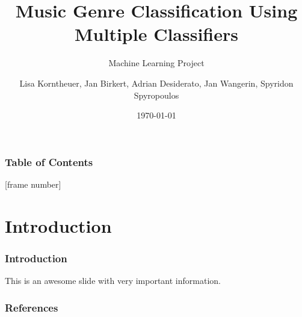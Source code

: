 \documentclass[10pt, aspectratio=169]{beamer}
\title{Music Genre Classification Using Multiple Classifiers}
\subtitle{Machine Learning Project}
\author{Lisa Korntheuer, Jan Birkert, Adrian Desiderato, Jan Wangerin, Spyridon Spyropoulos}
\institute{Technische Hochschule Ulm}
\date{\today}
\begin{document}
\newcommand{\subtext}[1]{$_{\text{#1}}$}

\begin{frame}
    \maketitle
\end{frame}
\begin{frame}[noframenumbering]
    \frametitle{Table of Contents}
    \tableofcontents
\end{frame}
\AtBeginSection[]{
        }
        [frame number]
\section{Introduction}
\begin{frame}
    \frametitle{Introduction}
    \begin{outline}
        \1 This is an awesome slide with very important information. 
    \end{outline}
\end{frame}



\begin{frame}
    \frametitle{References}
    {\scriptsize
    
    
    }
\end{frame}
\end{document}
